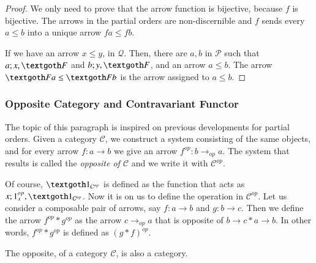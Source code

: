\documentclass [12pt]{book}
\begin{document}
\begin{proof}We only need to prove that the arrow function is bijective, because $f$ is bijective. The arrows in the partial orders are non-discernible and $f$ sends every $a\leq b$ into a unique arrow $fa\leq fb$. 

If we have an arrow $x\leq y$, in $\mathcal Q$. Then, there are $a,b$ in $\mathcal P$ such that $a;x,\textgoth F$ and $b;y,\textgoth F$, and an arrow $a\leq b$. The arrow $\textgoth Fa\leq\textgoth Fb$ is the arrow assigned to $a\leq b$.\end{proof}

\subsubsection{Opposite Category and Contravariant Functor}

The topic of this paragraph is inspired on previous developments for partial orders. Given a category $\mathcal C$, we construct a system consisting of the same objects, and for every arrow $f:a\rightarrow b$ we give an arrow $f^{op}:b\rightarrow_{op}a$. The system that results is called the \textit{opposite of $\mathcal C$} and we write it with $\mathcal C^{op}$. 

Of course, $\textgoth1_{\mathcal C^{op}}$ is defined as the function that acts as $x;1_x^{op},\textgoth1_{\mathcal C^{op}}$. Now it is on us to define the operation in $\mathcal C^{op}$. Let us consider a composable pair of arrows, say $f:a\rightarrow b$ and $g:b\rightarrow c$. Then we define the arrow $f^{op}*g^{op}$ as the arrow $c\rightarrow_{op}a$ that is opposite of $b\rightarrow c*a\rightarrow b$. In other words, $f^{op}*g^{op}$ is defined as $(g*f)^{op}$.

\begin{lemma op func 1}The opposite, of a category $\mathcal C$, is also a category.\end{lemma op func 1}
\end{document}
